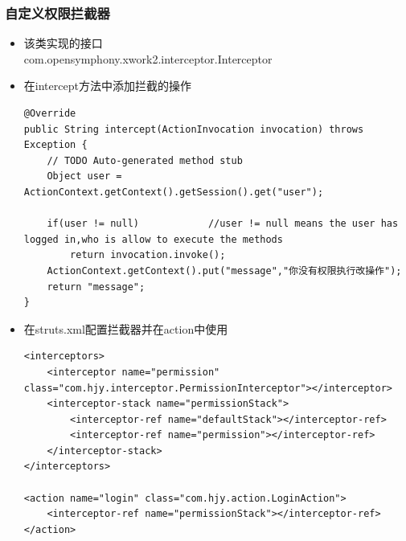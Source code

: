 \subsubsection{自定义权限拦截器}
\begin{itemize}
\item 该类实现的接口\\
com.opensymphony.xwork2.interceptor.Interceptor
\item 在intercept方法中添加拦截的操作
\begin{lstlisting}[style=JAVA]
@Override
public String intercept(ActionInvocation invocation) throws Exception {
	// TODO Auto-generated method stub
	Object user = ActionContext.getContext().getSession().get("user");
		
	if(user != null)			//user != null means the user has logged in,who is allow to execute the methods
		return invocation.invoke();
	ActionContext.getContext().put("message","你没有权限执行改操作");
	return "message";
}
\end{lstlisting}

\item 在struts.xml配置拦截器并在action中使用
\begin{lstlisting}[style=JAVA]
<interceptors>
	<interceptor name="permission" class="com.hjy.interceptor.PermissionInterceptor"></interceptor>
	<interceptor-stack name="permissionStack">
		<interceptor-ref name="defaultStack"></interceptor-ref>
		<interceptor-ref name="permission"></interceptor-ref>
	</interceptor-stack>
</interceptors>

<action name="login" class="com.hjy.action.LoginAction">
	<interceptor-ref name="permissionStack"></interceptor-ref>
</action>
\end{lstlisting}
\end{itemize}


